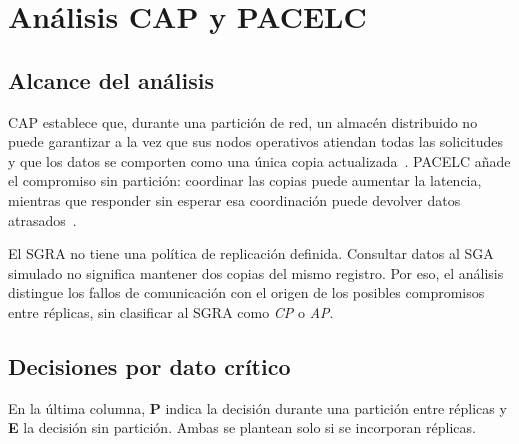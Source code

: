 \section{Análisis CAP y PACELC}

\subsection{Alcance del análisis}
CAP establece que, durante una partición de red, un almacén distribuido no puede garantizar a la vez que sus nodos operativos atiendan todas las solicitudes y que los datos se comporten como una única copia actualizada~\cite{vansteen2023-distributed}. PACELC añade el compromiso sin partición: coordinar las copias puede aumentar la latencia, mientras que responder sin esperar esa coordinación puede devolver datos atrasados~\cite{ahmed2023-consistency}.

El SGRA no tiene una política de replicación definida. Consultar datos al SGA simulado no significa mantener dos copias del mismo registro. Por eso, el análisis distingue los fallos de comunicación con el origen de los posibles compromisos entre réplicas, sin clasificar al SGRA como \emph{CP} o \emph{AP}.

\subsection{Decisiones por dato crítico}
En la última columna, \textbf{P} indica la decisión durante una partición entre réplicas y \textbf{E} la decisión sin partición. Ambas se plantean solo si se incorporan réplicas.

